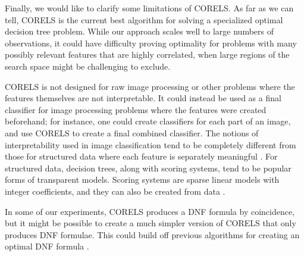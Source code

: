 \documentclass[twoside,11pt]{article}
\begin{document}
\begin{arxiv}

Finally, we would like to clarify some limitations of CORELS.
%
As far as we can tell, CORELS is the current best algorithm for solving a
specialized optimal decision tree problem.
%
While our approach scales well to large numbers of observations,
it could have difficulty proving optimality
for problems with many possibly relevant features that are highly correlated,
when large regions of the search space might be challenging to exclude.

CORELS is not designed for raw image processing or other problems where the
features themselves are not interpretable.
%
It could instead be used as a final classifier for image processing problems
where the features were created beforehand; for instance, one could create classifiers
for each part of an image, and use CORELS to create a final combined classifier. The notions of interpretability used in image classification tend to be completely different from those for structured data where each feature is separately meaningful \citep[e.g., see][]{LiEtAl18}. For structured data, decision trees, along with scoring systems, tend to be popular forms of transparent models. Scoring systems are sparse linear models with integer coefficients, and they can also be created from data \citep{UstunRu2017KDD,UstunRu2016SLIM}.

In some of our experiments, CORELS produces a DNF formula by coincidence, but it might be possible to create a much simpler version of CORELS that only produces DNF formulae. This could build off previous algorithms for creating an optimal DNF formula \citep{Rijnbeek10,WangEtAl16,WangEtAl2017}.


\end{arxiv}
\end{document}
